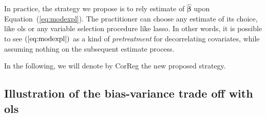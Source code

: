 \documentclass[11pt,a4paper]{article}
\begin{document}
\vspace{3mm}

In practice, the strategy we propose is to rely estimate of  $\hat{\boldsymbol{\beta}}$ upon Equation~(\ref{eq:modexpl}). The practitioner can choose any estimate of its choice, like {\sc ols} or any variable selection procedure like {\sc lasso}. In other words, it is possible to see $(\ref{eq:modexpl})$ as a kind of {\it pretreatment} for decorrelating covariates, while assuming nothing on the subsequent estimate process.

In the following, we will denote by {\sc CorReg} the new proposed strategy.

	\subsection{Illustration of the bias-variance trade off with {\sc ols}}	\label{sec:tradeoff}
	
\end{document}
